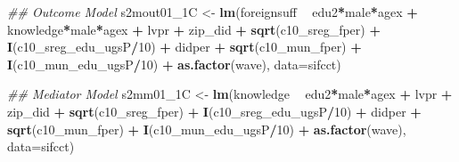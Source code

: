 \documentclass[
]{article}
\newenvironment{Shaded}{\begin{snugshade}}{\end{snugshade}}
\newcommand{\CommentTok}[1]{\textcolor[rgb]{0.56,0.35,0.01}{\textit{#1}}}
\newcommand{\DataTypeTok}[1]{\textcolor[rgb]{0.13,0.29,0.53}{#1}}
\newcommand{\DecValTok}[1]{\textcolor[rgb]{0.00,0.00,0.81}{#1}}
\newcommand{\KeywordTok}[1]{\textcolor[rgb]{0.13,0.29,0.53}{\textbf{#1}}}
\newcommand{\NormalTok}[1]{#1}
\newcommand{\OperatorTok}[1]{\textcolor[rgb]{0.81,0.36,0.00}{\textbf{#1}}}
\newcommand{\StringTok}[1]{\textcolor[rgb]{0.31,0.60,0.02}{#1}}
\begin{document}
\begin{Shaded}
\begin{Highlighting}[]
\CommentTok{## Outcome Model }
\NormalTok{s2mout01_1C <-}\StringTok{ }\KeywordTok{lm}\NormalTok{(foreignsuff  }\OperatorTok{~}\StringTok{ }\NormalTok{edu2}\OperatorTok{*}\NormalTok{male}\OperatorTok{*}\NormalTok{agex }\OperatorTok{+}\StringTok{ }\NormalTok{knowledge}\OperatorTok{*}\NormalTok{male}\OperatorTok{*}\NormalTok{agex }\OperatorTok{+}\StringTok{ }\NormalTok{lvpr }\OperatorTok{+}\StringTok{  }
\StringTok{                    }\NormalTok{zip_did }\OperatorTok{+}\StringTok{ }\KeywordTok{sqrt}\NormalTok{(c10_sreg_fper) }\OperatorTok{+}\StringTok{ }\KeywordTok{I}\NormalTok{(c10_sreg_edu_ugsP}\OperatorTok{/}\DecValTok{10}\NormalTok{) }\OperatorTok{+}\StringTok{ }
\StringTok{                    }\NormalTok{didper }\OperatorTok{+}\StringTok{ }\KeywordTok{sqrt}\NormalTok{(c10_mun_fper) }\OperatorTok{+}\StringTok{ }\KeywordTok{I}\NormalTok{(c10_mun_edu_ugsP}\OperatorTok{/}\DecValTok{10}\NormalTok{) }\OperatorTok{+}\StringTok{ }
\StringTok{                    }\KeywordTok{as.factor}\NormalTok{(wave), }\DataTypeTok{data=}\NormalTok{sifcct)}

\CommentTok{## Mediator Model}
\NormalTok{s2mm01_1C <-}\StringTok{ }\KeywordTok{lm}\NormalTok{(knowledge  }\OperatorTok{~}\StringTok{ }\NormalTok{edu2}\OperatorTok{*}\NormalTok{male}\OperatorTok{*}\NormalTok{agex }\OperatorTok{+}\StringTok{ }\NormalTok{lvpr }\OperatorTok{+}\StringTok{  }
\StringTok{                  }\NormalTok{zip_did }\OperatorTok{+}\StringTok{ }\KeywordTok{sqrt}\NormalTok{(c10_sreg_fper) }\OperatorTok{+}\StringTok{ }\KeywordTok{I}\NormalTok{(c10_sreg_edu_ugsP}\OperatorTok{/}\DecValTok{10}\NormalTok{) }\OperatorTok{+}\StringTok{ }
\StringTok{                  }\NormalTok{didper }\OperatorTok{+}\StringTok{ }\KeywordTok{sqrt}\NormalTok{(c10_mun_fper) }\OperatorTok{+}\StringTok{ }\KeywordTok{I}\NormalTok{(c10_mun_edu_ugsP}\OperatorTok{/}\DecValTok{10}\NormalTok{) }\OperatorTok{+}\StringTok{ }
\StringTok{                  }\KeywordTok{as.factor}\NormalTok{(wave), }\DataTypeTok{data=}\NormalTok{sifcct)}


\end{Highlighting}
\end{Shaded}
\end{document}
